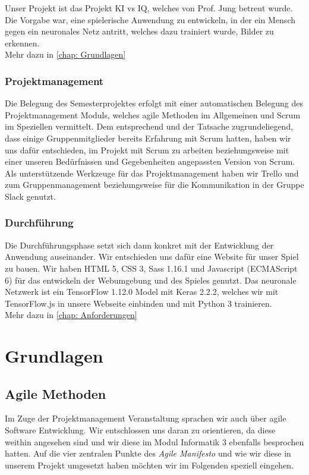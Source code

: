 \documentclass[11pt]{article}
\begin{document}
Unser Projekt ist das Projekt KI vs IQ, welches von Prof. Jung betreut wurde.
Die Vorgabe war, eine spielerische Anwendung zu entwickeln, in der ein Mensch gegen ein neuronales Netz antritt, welches dazu trainiert wurde, Bilder zu erkennen.\\
Mehr dazu in \autoref{chap: Grundlagen}
	
\subsubsection{  Projektmanagement }
\label{chap: Projektmanagement}
Die Belegung des Semesterprojektes erfolgt mit einer automatischen Belegung des Projektmanagement Moduls, welches agile Methoden im Allgemeinen und Scrum im Speziellen vermittelt. Dem entsprechend und der Tatsache zugrundeliegend, dass einige Gruppenmitglieder bereits Erfahrung mit Scrum hatten, haben wir uns dafür entschieden, im Projekt mit Scrum zu arbeiten beziehungsweise mit einer unseren Bedürfnissen und Gegebenheiten angepassten Version von Scrum.\\
Als unterstützende Werkzeuge für das Projektmanagement haben wir Trello und zum Gruppenmanagement beziehungsweise für die Kommunikation in der Gruppe Slack genutzt.

\subsubsection{ Durchführung }
\label{chap: durchfuhrung}
Die Durchführungsphase setzt sich dann konkret mit der Entwicklung der Anwendung auseinander. Wir entschieden uns dafür eine Website für unser Spiel zu bauen. Wir haben HTML 5, CSS 3, Sass 1.16.1 und Javascript (ECMAScript 6) für das entwickeln der Webumgebung und des Spieles genutzt. Das neuronale Netzwerk ist ein TensorFlow 1.12.0 Model mit Keras 2.2.2, welches wir mit TensorFlow.js in unsere Webseite einbinden und mit Python 3 trainieren.\\
Mehr dazu in \autoref{chap: Anforderungen}

\section{Grundlagen}
\label{chap: Grundlagen}
\subsection{Agile Methoden}
\label{chap: agileMethods}
Im Zuge der Projektmanagement Veranstaltung sprachen wir auch über agile Software Entwicklung. Wir entschlossen uns daran zu orientieren, da diese weithin angesehen sind und wir diese im Modul Informatik 3 ebenfalls besprochen hatten. Auf die vier zentralen Punkte des \textit{Agile Manifesto} \parencite{KentBeck2001} und wie wir diese in unserem Projekt umgesetzt haben möchten wir im Folgenden speziell eingehen.
\end{document}
